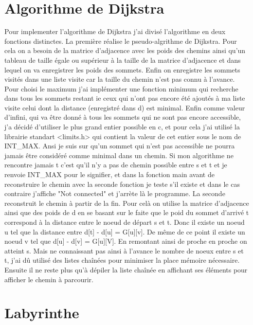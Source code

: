 \documentclass[a4paper, 11pt]{report}
\begin{document}
\newpage
\section{Algorithme de Dijkstra}

\vspace{2\baselineskip}
Pour implementer l'algorithme de Dijkstra j'ai divisé l'algorithme en deux fonctions distinctes.
\newline
La première réalise le pseudo-algrithme de Dijkstra. Pour cela on a besoin de la matrice d'adjacence avec les poids des chemins ainsi qu'un tableau de taille égale ou supérieur à la taille de la matrice d'adjacence et dans lequel on va enregistrer les poids des sommets. Enfin on enregistre les sommets visités dans une liste visite car la taille du chemin n'est pas connu à l'avance. Pour choisi le maximum j'ai implémenter une fonction minimum qui recherche dans tous les sommets restant ie ceux qui n'ont pas encore été ajoutés à ma liste visite celui dont la distance (enregistré dans d) est minimal. Enfin comme valeur d'infini, qui va être donné à tous les sommets qui ne sont pas encore accessible, j'a décidé d'utiliser le plus grand entier possible en c, et pour cela j'ai utilisé la librairie standart <limits.h> qui contient la valeur de cet entier sous le nom de INT\_MAX. Ansi je suis sur qu'un sommet qui n'est pas accessible ne pourra jamais être considéré comme minimal dans un chemin. Si mon algorithme ne rencontre jamais t c'est qu'il n'y a pas de chemin possible entre s et t et je renvoie INT\_MAX pour le signifier, et dans la fonction main avant de reconstruire le chemin avec la seconde fonction je teste s'il existe et dans le cas contraire j'affiche "Not connected" et j'arrète là le programme.
\newline
La seconde reconstruit le chemin à partir de la fin. Pour celà on utilise la matrice d'adjacence ainsi que des poids de d en se basant sur le faite que le poid du sommet d'arrivé t correspond à la distance entre le noeud de départ s et t. Donc il existe un noeud u tel que la distance entre d[t] - d[u] = G[u][v]. De même de ce point il existe un noeud v tel que d[u] - d[v] = G[u][V]. En remontant ainsi de proche en proche on atteint s. Mais ne connaissant pas ainsi à l'avance le nombre de noeux entre s et t, j'ai dû utilisé des listes chaînées pour minimiser la place mémoire nécessaire. Ensuite il ne reste plus qu'à dépiler la liste chaînée en affichant ses éléments pour afficher le chemin à parcourir.

\newpage
\section{Labyrinthe}
\end{document}
